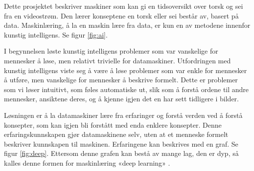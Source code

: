 Dette prosjektet beskriver maskiner som kan gi en tidsoversikt over torsk og sei fra en videostrøm. Den lærer konseptene en torsk eller sei består av, basert på data. Maskinlæring, å la en maskin lære fra data, er kun en av metodene innenfor kunstig intelligens. Se figur \ref{fig:ai}. \cite{Canziani m.fl. 2017 s. 1}

I begynnelsen løste kunstig intelligens problemer som var vanskelige for mennesker å løse, men relativt trivielle for datamaskiner. Utfordringen med kunstig intelligens viste seg å være å løse problemer som var enkle for mennesker å utføre, men vanskelige for mennesker å beskrive formelt. Dette er problemer som vi løser intuitivt, som føles automatiske ut, slik som å forstå ordene til andre mennesker, ansiktene deres, og å kjenne igjen det en har sett tidligere i bilder. \cite{Goodfellow m.fl. 2016 s. 1}

Løsningen er å la datamaskiner lære fra erfaringer og forstå verden ved å forstå konsepter, som kan igjen bli forstått med enda enklere konsepter. Denne erfaringskunnskapen gjør datamaskinene selv, uten at et menneske formelt beskriver kunnskapen til maskinen. Erfaringene kan beskrives med en graf. Se figur \ref{fig:deep}. Ettersom denne grafen kan bestå av mange lag, den er dyp, så kalles denne formen for maskinlæring «deep learning» \cite{Goodfellow m.fl. 2016 s. 1}.



